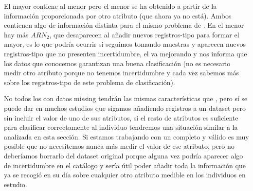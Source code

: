 El \CC mayor contiene al menor pero el menor se ha obtenido a partir de la información proporcionada por otro atributo (que ahora ya no está). Ambos contienen algo de información distinta para el mismo problema de \clasificacion. En el menor hay más $ARN_2$, que desaparecen al añadir nuevos registros-tipo para formar el mayor, es lo que podría ocurrir si seguimos tomando muestras y aparecen nuevos registros-tipo que no presenten incertidumbre, el \CC va mejorando y nos informa que los datos que conocemos garantizan una buena clasificación (no es necesario medir otro atributo porque no tenemos incertidumbre y cada vez sabemos más sobre los registros-tipo de este problema de clasificación).







No todos los \catalogos con datos missing tendrán las mismas características que \mushroom, pero sí se puede dar en muchos estudios que sigamos añadiendo registros a un dataset pero sin incluir el valor de uno de sus atributos, si el resto de atributos es suficiente para clasificar correctamente al individuo tendremos una situación similar a la analizada en esta sección. Si estamos trabajando con un \CC completo y válido es muy posible que no necesitemos nunca más medir el valor de ese atributo, pero no deberíamos borrarlo del dataset original porque alguna vez podría aparecer algo de incertidumbre en el catálogo y sería útil poder añadir toda la información que ya se recogió en su día sobre cualquier otro atributo medible en los individuos en estudio.

